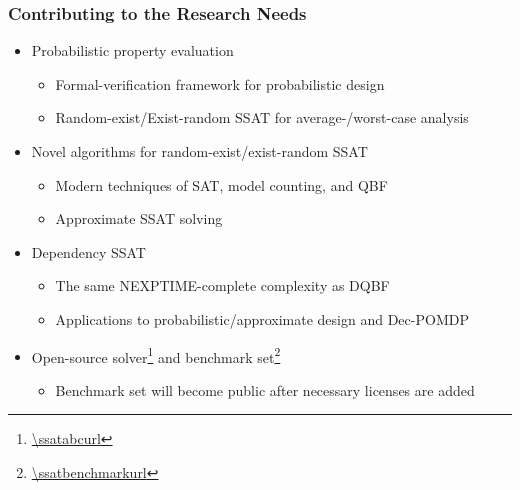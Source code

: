 \begin{frame}
      \frametitle{Contributing to the Research Needs}
      \begin{itemize}
            \item Probabilistic property evaluation
                  \begin{itemize}
                        \item Formal-verification framework for probabilistic design
                        \item Random-exist/Exist-random SSAT for average-/worst-case analysis
                  \end{itemize}
                  \pause
            \item Novel algorithms for random-exist/exist-random SSAT
                  \begin{itemize}
                        \item Modern techniques of SAT, model counting, and QBF
                        \item Approximate SSAT solving
                  \end{itemize}
                  \pause
            \item Dependency SSAT
                  \begin{itemize}
                        \item The same NEXPTIME-complete complexity as DQBF
                        \item Applications to probabilistic/approximate design and Dec-POMDP
                  \end{itemize}
                  \pause
            \item Open-source solver\footnote{\url{\ssatabcurl}} and benchmark set\footnote{\url{\ssatbenchmarkurl}}
                  \begin{itemize}
                        \item Benchmark set will become public after necessary licenses are added
                  \end{itemize}
      \end{itemize}
\end{frame}